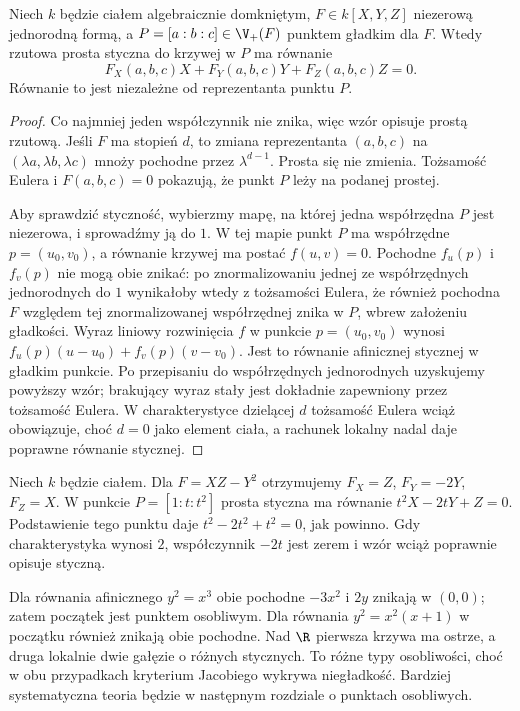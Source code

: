 \begin{twierdzenie}
\label{tw:tangent-projective}
Niech $k$ będzie ciałem algebraicznie domkniętym,
$F\in k[X,Y,Z]$ niezerową jednorodną formą,
a $P=[a:b:c]\in\V_+(F)$ punktem gładkim dla $F$.
Wtedy rzutowa prosta styczna do krzywej w $P$ ma równanie
\[
 F_X(a,b,c)X+F_Y(a,b,c)Y+F_Z(a,b,c)Z=0.
\]
Równanie to jest niezależne od reprezentanta punktu $P$.
\end{twierdzenie}
\begin{proof}
Co najmniej jeden współczynnik nie znika, więc wzór
opisuje prostą rzutową. Jeśli $F$ ma stopień $d$,
to zmiana reprezentanta $(a,b,c)$ na
$(\lambda a,\lambda b,\lambda c)$ mnoży pochodne
przez $\lambda^{d-1}$. Prosta się nie zmienia.
Tożsamość Eulera i $F(a,b,c)=0$ pokazują,
że punkt $P$ leży na podanej prostej.

Aby sprawdzić styczność, wybierzmy mapę, na której jedna
współrzędna $P$ jest niezerowa, i sprowadźmy ją do $1$.
W tej mapie punkt $P$ ma współrzędne $p=(u_0,v_0)$,
a równanie krzywej ma postać $f(u,v)=0$.
Pochodne $f_u(p)$ i $f_v(p)$ nie mogą obie znikać:
po znormalizowaniu jednej ze współrzędnych jednorodnych do $1$
wynikałoby wtedy z tożsamości Eulera, że również pochodna $F$
względem tej znormalizowanej współrzędnej znika w $P$,
wbrew założeniu gładkości.
Wyraz liniowy rozwinięcia $f$ w punkcie $p=(u_0,v_0)$
wynosi $f_u(p)(u-u_0)+f_v(p)(v-v_0)$.
Jest to równanie afinicznej stycznej w gładkim punkcie.
Po przepisaniu do współrzędnych jednorodnych uzyskujemy
powyższy wzór; brakujący wyraz stały jest dokładnie
zapewniony przez tożsamość Eulera. W charakterystyce
dzielącej $d$ tożsamość Eulera wciąż obowiązuje,
choć $d=0$ jako element ciała, a rachunek lokalny
nadal daje poprawne równanie stycznej.
\end{proof}

\begin{przyklad}
Niech $k$ będzie ciałem. Dla $F=XZ-Y^2$ otrzymujemy $F_X=Z$, $F_Y=-2Y$,
$F_Z=X$. W punkcie $P=[1:t:t^2]$ prosta styczna ma
równanie $t^2X-2tY+Z=0$. Podstawienie tego punktu daje
$t^2-2t^2+t^2=0$, jak powinno. Gdy charakterystyka
wynosi $2$, współczynnik $-2t$ jest zerem i wzór
wciąż poprawnie opisuje styczną.
\end{przyklad}

\begin{przyklad}
Dla równania afinicznego $y^2=x^3$ obie pochodne
$-3x^2$ i $2y$ znikają w $(0,0)$; zatem początek
jest punktem osobliwym. Dla równania
$y^2=x^2(x+1)$ w początku również znikają obie pochodne.
Nad $\R$ pierwsza krzywa ma ostrze, a druga lokalnie
dwie gałęzie o różnych stycznych. To różne typy osobliwości,
choć w obu przypadkach kryterium Jacobiego wykrywa
niegładkość. Bardziej systematyczna teoria będzie
w następnym rozdziale o punktach osobliwych.
\end{przyklad}


